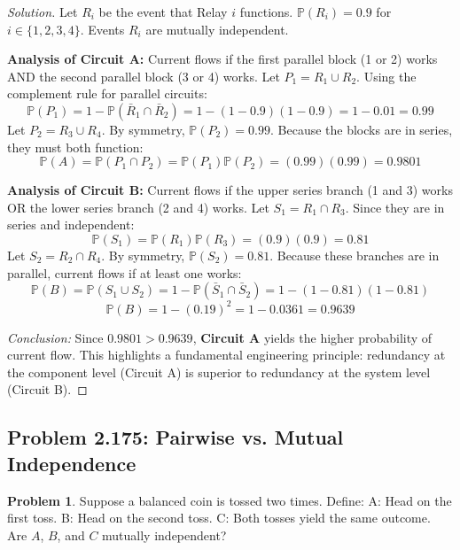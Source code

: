 \documentclass[11pt]{article}
\theoremstyle{definition}
\newtheorem{problem}{Problem}[section]
\theoremstyle{remark}
\newcommand{\Prob}{\mathbb{P}}
\begin{document}
\begin{proof}[Solution]
Let $R_i$ be the event that Relay $i$ functions. $\Prob(R_i) = 0.9$ for $i \in \{1,2,3,4\}$. Events $R_i$ are mutually independent.

\textbf{Analysis of Circuit A:}
Current flows if the first parallel block (1 or 2) works AND the second parallel block (3 or 4) works.
Let $P_1 = R_1 \cup R_2$. Using the complement rule for parallel circuits:
\[ \Prob(P_1) = 1 - \Prob(\bar{R}_1 \cap \bar{R}_2) = 1 - (1-0.9)(1-0.9) = 1 - 0.01 = 0.99 \]
Let $P_2 = R_3 \cup R_4$. By symmetry, $\Prob(P_2) = 0.99$.
Because the blocks are in series, they must both function:
\[ \Prob(A) = \Prob(P_1 \cap P_2) = \Prob(P_1)\Prob(P_2) = (0.99)(0.99) = 0.9801 \]

\textbf{Analysis of Circuit B:}
Current flows if the upper series branch (1 and 3) works OR the lower series branch (2 and 4) works.
Let $S_1 = R_1 \cap R_3$. Since they are in series and independent:
\[ \Prob(S_1) = \Prob(R_1)\Prob(R_3) = (0.9)(0.9) = 0.81 \]
Let $S_2 = R_2 \cap R_4$. By symmetry, $\Prob(S_2) = 0.81$.
Because these branches are in parallel, current flows if at least one works:
\[ \Prob(B) = \Prob(S_1 \cup S_2) = 1 - \Prob(\bar{S}_1 \cap \bar{S}_2) = 1 - (1-0.81)(1-0.81) \]
\[ \Prob(B) = 1 - (0.19)^2 = 1 - 0.0361 = 0.9639 \]

\textit{Conclusion:} Since $0.9801 > 0.9639$, \textbf{Circuit A} yields the higher probability of current flow. This highlights a fundamental engineering principle: redundancy at the component level (Circuit A) is superior to redundancy at the system level (Circuit B).
\end{proof}

\subsection{Problem 2.175: Pairwise vs. Mutual Independence}
\begin{problem}
Suppose a balanced coin is tossed two times. Define:
A: Head on the first toss.
B: Head on the second toss.
C: Both tosses yield the same outcome.
Are $A$, $B$, and $C$ mutually independent?
\end{problem}
\end{document}
